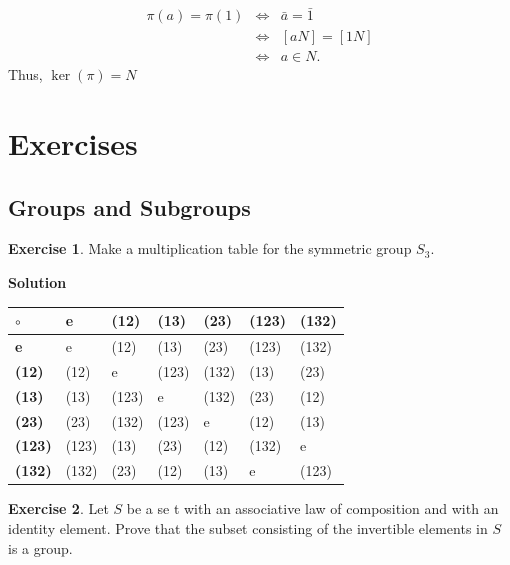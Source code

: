 \documentclass[
]{book}
\theoremstyle{definition}
\theoremstyle{definition}
\theoremstyle{definition}
\newtheorem{exercise}{Exercise}[chapter]
\theoremstyle{definition}
\theoremstyle{remark}
\begin{document}
\begin{eqnarray}
\pi (a) =\pi(1) &\iff & \bar{a}= \bar{1}\\
& \iff & [aN] = [1N]\\
& \iff & a \in N.
\end{eqnarray}
Thus, \(\ker(\pi)=N\)

\hypertarget{exercises-1}{%
\section{Exercises}\label{exercises-1}}

\hypertarget{groups-and-subgroups-1}{%
\subsection{Groups and Subgroups}\label{groups-and-subgroups-1}}

\begin{exercise}
\protect\hypertarget{exr:unnamed-chunk-46}{}\label{exr:unnamed-chunk-46}Make a multiplication table for the symmetric group \(S_3\).
\end{exercise}

\textbf{Solution}

\begin{longtable}[]{@{}lllllll@{}}
\toprule\noalign{}
\(\circ\) & \textbf{e} & (12) & (13) & (23) & (123) & (132) \\
\midrule\noalign{}
\endhead
\bottomrule\noalign{}
\endlastfoot
\textbf{e} & e & (12) & (13) & (23) & (123) & (132) \\
\textbf{(12)} & (12) & e & (123) & (132) & (13) & (23) \\
\textbf{(13)} & (13) & (123) & e & (132) & (23) & (12) \\
\textbf{(23)} & (23) & (132) & (123) & e & (12) & (13) \\
\textbf{(123)} & (123) & (13) & (23) & (12) & (132) & e \\
\textbf{(132)} & (132) & (23) & (12) & (13) & e & (123) \\
\end{longtable}

\begin{exercise}
\protect\hypertarget{exr:unnamed-chunk-47}{}\label{exr:unnamed-chunk-47}Let \(S\) be a se t with an associative law of composition and with an identity element. Prove that the subset consisting of the invertible elements in \(S\) is a group.
\end{exercise}
\end{document}
